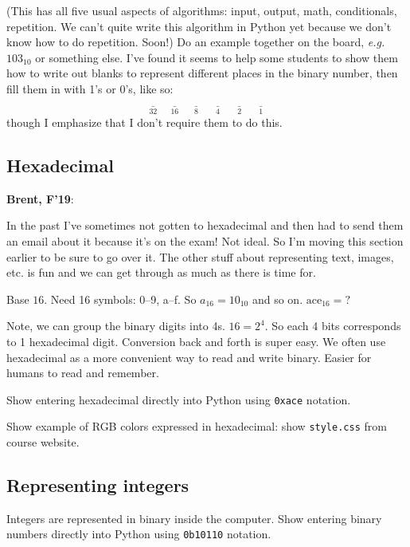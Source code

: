 \documentclass{article}
\newcommand{\eg}{\emph{e.g.}\xspace}
\newenvironment{reflect}[1]
{
  \noindent
  \begin{lrbox}{\reflectbox}
    \begin{minipage}[t]{\textwidth}
      \textbf{#1}:
}{
    \end{minipage}
  \end{lrbox}
  \fbox{\usebox{\reflectbox}}
}
\begin{document}
(This has all five usual aspects of algorithms: input, output, math,
conditionals, repetition.  We can't quite write this algorithm in
Python yet because we don't know how to do repetition.  Soon!)  Do an
example together on the board, \eg $103_{10}$ or something else. I've
found it seems to help some students to show them how to write out
blanks to represent different places in the binary number, then fill
them in with 1's or 0's, like so:
\[ \underset{32}{\underline{\phantom{XX}}} \; \underset{16}{\underline{\phantom{XX}}} \; \underset{8}{\underline{\phantom{XX}}} \; \underset{4}{\underline{\phantom{XX}}} \; \underset{2}{\underline{\phantom{XX}}} \; \underset{1}{\underline{\phantom{XX}}} \]
though I emphasize that I don't require them to do this.

\subsection*{Hexadecimal}

\begin{reflect}{Brent, F'19}
  In the past I've sometimes not gotten to hexadecimal and then had to
  send them an email about it because it's on the exam!  Not ideal.
  So I'm moving this section earlier to be sure to go over it.  The
  other stuff about representing text, images, etc. is fun and we can
  get through as much as there is time for.
\end{reflect}

Base $16$.  Need 16 symbols: 0--9, a--f. So $a_{16} = 10_{10}$ and so
on. $\mbox{ace}_{16} = ?$

Note, we can group the binary digits into 4s.  $16 = 2^4$.  So each 4
bits corresponds to 1 hexadecimal digit.  Conversion back and forth is
super easy.  We often use hexadecimal as a more convenient way to read
and write binary.  Easier for humans to read and remember.

Show entering hexadecimal directly into Python using \verb|0xace|
notation.

Show example of RGB colors expressed in hexadecimal: show
\verb|style.css| from course website.

\subsection*{Representing integers}

Integers are represented in binary inside the computer.  Show entering
binary numbers directly into Python using \verb|0b10110| notation.
\end{document}
